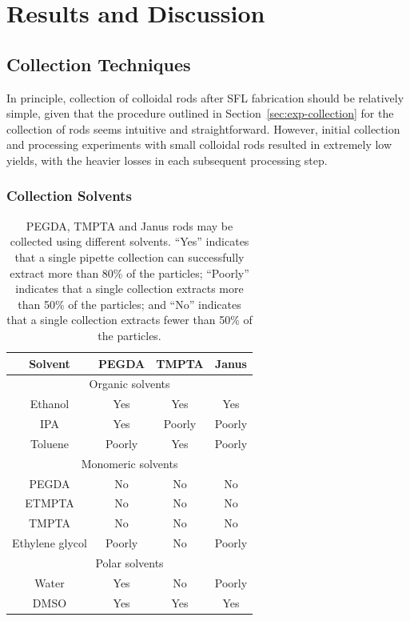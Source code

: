 \section{Results and Discussion}

\subsection{Collection Techniques}
\label{sec:rod-collection}

In principle, collection of colloidal rods after SFL fabrication should be relatively simple,
given that the 
procedure outlined in Section~\ref{sec:exp-collection} for the collection of rods seems intuitive and
straightforward.  However, initial 
collection and processing experiments 
with small colloidal rods resulted in
extremely low yields, with the heavier losses in each subsequent processing step.


\subsubsection{Collection Solvents}

\begin{table}[h]
\begin{center}
\begin{tabular}{| c | c | c | c |}
\hline 
Solvent & PEGDA & TMPTA & Janus \\ \hline
\multicolumn{4}{|c|}{Organic solvents} \\ \hline
Ethanol & Yes & Yes & Yes \\
IPA & Yes & Poorly & Poorly \\
Toluene & Poorly & Yes & Poorly \\
\hline
\multicolumn{4}{|c|}{Monomeric solvents} \\ \hline
PEGDA & No & No & No \\
ETMPTA & No & No & No \\
TMPTA & No & No & No \\
Ethylene glycol & Poorly & No & Poorly \\
\hline
\multicolumn{4}{|c|}{Polar solvents} \\ \hline
Water & Yes & No & Poorly \\
DMSO & Yes & Yes & Yes \\
\hline
\end{tabular}

\end{center}
\caption{PEGDA, TMPTA and Janus rods may be collected using different solvents. ``Yes'' indicates that
a single pipette collection can successfully extract more than 80\% of the particles;
``Poorly'' indicates that a single collection extracts more than 50\% of the particles; and
``No'' indicates that a single collection extracts fewer than 50\% of the particles.}
\label{tab:collect-solvent}
\end{table}

